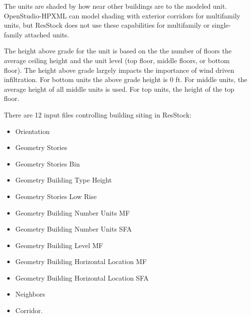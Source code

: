 
The units are shaded by how near other buildings are to the modeled unit.  OpenStudio-HPXML can model shading with exterior corridors for multifamily units, but ResStock does not use these capabilities for multifamily or single-family attached units.

The height above grade for the unit is based on the the number of floors the average ceiling height and the unit level (top floor, middle floors, or bottom floor). The height above grade largely impacts the importance of wind driven infiltration. For bottom units the above grade height is 0 ft. For middle units, the average height of all middle units is used. For top units, the height of the top floor.

There are 12 input files controlling building siting in ResStock:

\begin{itemize}
    \item Orientation
    \item Geometry Stories
    \item Geometry Stories Bin
    \item Geometry Building Type Height
    \item Geometry Stories Low Rise
    \item Geometry Building Number Units MF
    \item Geometry Building Number Units SFA
    \item Geometry Building Level MF
    \item Geometry Building Horizontal Location MF
    \item Geometry Building Horizontal Location SFA
    \item Neighbors
    \item Corridor.

\end{itemize}

